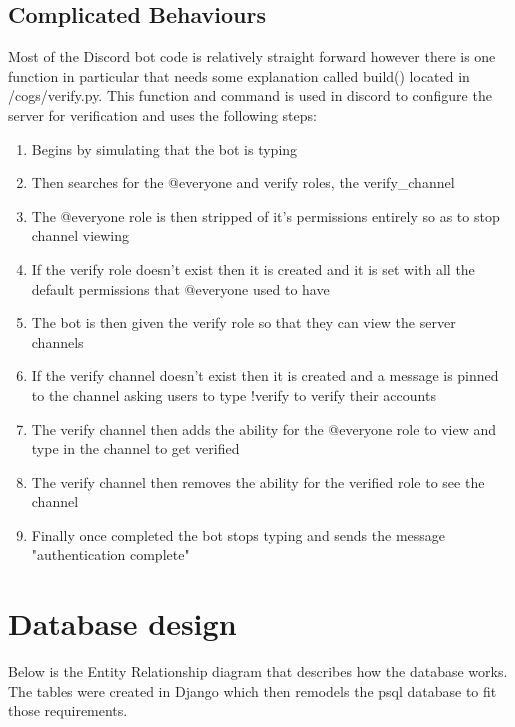 \subsection{Complicated Behaviours}
Most of the Discord bot code is relatively straight forward however there is one function in particular that needs some explanation called build() located in /cogs/verify.py. This function and command is used in discord to configure the server for verification and uses the following steps:

\begin{enumerate}
	\item Begins by simulating that the bot is typing
	\item Then searches for the @everyone and verify roles, the verify\_channel
	\item The @everyone role is then stripped of it's permissions entirely so as to stop channel viewing
	\item If the verify role doesn't exist then it is created and it is set with all the default permissions that @everyone used to have
	\item The bot is then given the verify role so that they can view the server channels
	\item If the verify channel doesn't exist then it is created and a message is pinned to the channel asking users to type !verify to verify their accounts
	\item The verify channel then adds the ability for the @everyone role to view and type in the channel to get verified
	\item The verify channel then removes the ability for the verified role to see the channel
	\item Finally once completed the bot stops typing and sends the message "authentication complete"
\end{enumerate}

\section{Database design}
Below is the Entity Relationship diagram that describes how the database works. The tables were created in Django which then remodels the psql \cite{psql} database to fit those requirements. 

